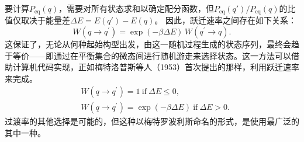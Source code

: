 要计算\(P_{\mathrm{eq}}(q)\)，需要对所有状态求和以确定配分函数，但\(P_{\mathrm{eq}}(q')/P_{\mathrm{eq}}(q)\)的比值仅取决于能量差\(\Delta E = E(q') - E(q)\)。
因此，跃迁速率之间存在如下关系：
\begin{equation}\tag{16.2.6}\label{eq:16.2.6}
W ( q \rightarrow q ^{\prime} ) = \exp ( - \beta \Delta E ) \, W ( q ^{\prime} \rightarrow q ) .
\end{equation}
这保证了，无论从何种起始构型出发，由这一随机过程生成的状态序列，最终会趋于等价——即通过在平衡集合的微态间进行随机游走来选择状态。这一方法可以借助计算机代码实现，正如梅特洛普斯等人（1953）首次提出的那样，利用跃迁速率来完成。
\begin{equation}\tag{16.2.7}\label{eq:16.2.7}
\begin{array}{rl} & { W ( q \to q ^{\prime} ) = 1  \mathrm { ~ i f ~ } \Delta E \leq 0 , } \\& { W ( q \to q ^{\prime} ) = \exp ( - \beta \Delta E )  \mathrm { ~ i f ~ } \Delta E > 0 . } \end{array}
\end{equation}
过渡率的其他选择是可能的，但这种以梅特罗波利斯命名的形式，是使用最广泛的其中一种。
